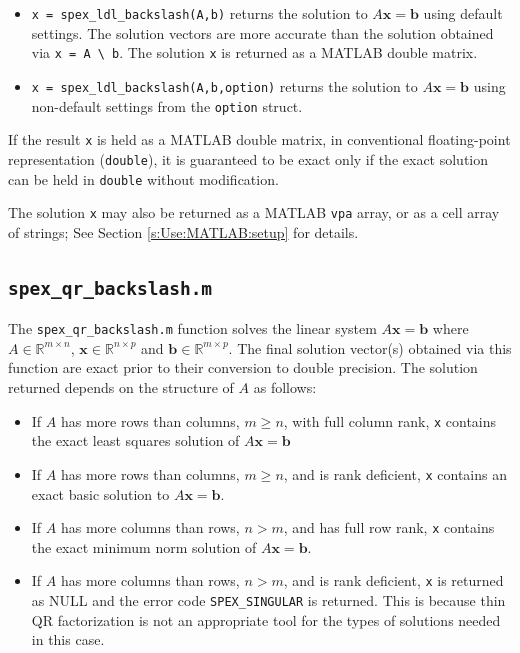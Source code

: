 \documentclass[12pt,oneside]{book}
\theoremstyle{definition}
\renewcommand{\b}{\mathbf{b}}
\newcommand{\x}{\mathbf{x}}
\begin{document}
\begin{itemize}

\item \verb|x = spex_ldl_backslash(A,b)| returns the solution to $A \x =
\b$ using default settings. The solution vectors are more accurate than
the solution obtained via \verb|x = A \ b|.  The solution \verb|x| is
returned as a MATLAB double matrix.

\item \verb|x = spex_ldl_backslash(A,b,option)| returns the solution to $A \x =
\b$ using non-default settings from the \verb|option| struct.

\end{itemize}

If the result \verb|x| is held as a MATLAB double matrix, in conventional
floating-point representation (\verb|double|), it is guaranteed to be exact
only if the exact solution can be held in \verb|double| without modification.

The solution \verb|x| may also be returned as a MATLAB \verb|vpa| array, or as
a cell array of strings; See Section \ref{s:Use:MATLAB:setup} for details.

\subsection{\texttt{spex\_qr\_backslash.m}}
The \verb|spex_qr_backslash.m| function solves the linear system $A \x = \b$ where
$A \in \mathbb{R}^{m \times n}$, $\x \in \mathbb{R}^{n \times p}$ and $\b \in
\mathbb{R}^{m \times p}$. The final solution vector(s) obtained via this
function are exact prior to their conversion to double precision. The solution returned depends on the structure of $A$ as follows:
\begin{itemize}
    \item If $A$ has more rows than columns, $m \geq n$, with full column rank, \verb|x| contains the exact least squares solution of $A \x = \b$
    \item If $A$ has more rows than columns, $m \geq n$, and is rank deficient, \verb|x| contains an exact basic solution to $A \x = \b$.
    \item If $A$ has more columns than rows, $n > m$, and has full row rank, \verb|x| contains the exact minimum norm solution of $A \x = \b$.
    \item If $A$ has more columns than rows, $n > m$, and is rank deficient, \verb|x| is returned as NULL and the error code \verb|SPEX_SINGULAR| is returned. This is because thin QR factorization is not an appropriate tool for the types of solutions needed in this case.
\end{itemize}
\end{document}
